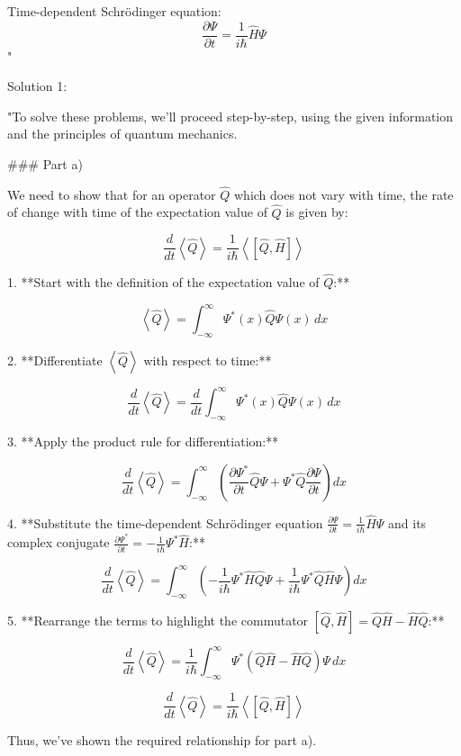Time-dependent Schrödinger equation: 
\[ \frac{\partial\Psi}{\partial t} = \frac{1}{i\hbar}\hat{H}\Psi \]"

Solution 1:

"To solve these problems, we'll proceed step-by-step, using the given information and the principles of quantum mechanics.

### Part a)

We need to show that for an operator \( \hat{Q} \) which does not vary with time, the rate of change with time of the expectation value of \( \hat{Q} \) is given by:

\[ \frac{d}{dt}\left<\hat{Q}\right> = \frac{1}{i\hbar}\left< \left[ \hat{Q}, \hat{H} \right] \right> \]

1. **Start with the definition of the expectation value of \( \hat{Q} \):**

\[ \left< \hat{Q} \right> = \int_{-\infty}^{\infty} \Psi^{*}(x) \hat{Q} \Psi(x) \, dx \]

2. **Differentiate \( \left< \hat{Q} \right> \) with respect to time:**

\[ \frac{d}{dt}\left<\hat{Q}\right> = \frac{d}{dt}\int_{-\infty}^{\infty} \Psi^{*}(x) \hat{Q} \Psi(x) \, dx \]

3. **Apply the product rule for differentiation:**

\[ \frac{d}{dt}\left<\hat{Q}\right> = \int_{-\infty}^{\infty} \left( \frac{\partial \Psi^{*}}{\partial t} \hat{Q} \Psi + \Psi^{*} \hat{Q} \frac{\partial \Psi}{\partial t} \right) dx \]

4. **Substitute the time-dependent Schrödinger equation \( \frac{\partial\Psi}{\partial t} = \frac{1}{i\hbar}\hat{H}\Psi \) and its complex conjugate \( \frac{\partial\Psi^{*}}{\partial t} = -\frac{1}{i\hbar}\Psi^{*}\hat{H} \):**

\[ \frac{d}{dt}\left<\hat{Q}\right> = \int_{-\infty}^{\infty} \left( -\frac{1}{i\hbar}\Psi^{*} \hat{H} \hat{Q} \Psi + \frac{1}{i\hbar}\Psi^{*} \hat{Q} \hat{H} \Psi \right) dx \]

5. **Rearrange the terms to highlight the commutator \( \left[ \hat{Q}, \hat{H} \right] = \hat{Q}\hat{H} - \hat{H}\hat{Q} \):**

\[ \frac{d}{dt}\left<\hat{Q}\right> = \frac{1}{i\hbar}\int_{-\infty}^{\infty} \Psi^{*} \left( \hat{Q}\hat{H} - \hat{H}\hat{Q} \right) \Psi \, dx \]

\[ \frac{d}{dt}\left<\hat{Q}\right> = \frac{1}{i\hbar}\left< \left[ \hat{Q}, \hat{H} \right] \right> \]

Thus, we've shown the required relationship for part a).

